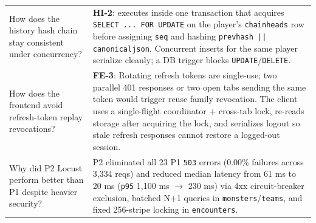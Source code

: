 \documentclass[10.5pt,a4paper]{article}
\DeclareRobustCommand{\code}[1]{\begingroup\def\_{\textunderscore\allowbreak}\texttt{#1}\endgroup}
\begin{document}
\begin{table}[H]
\begin{tabularx}{\linewidth}{@{}L{4.2cm}Y@{}}
\addlinespace
How does the history hash chain stay consistent under concurrency? &
\textbf{HI-2}:  executes inside one transaction that acquires \code{SELECT ... FOR UPDATE} on the player's \code{chain\_heads} row before assigning \code{seq} and hashing \code{prev\_hash || canonical\_json}. Concurrent inserts for the same player serialize cleanly; a DB trigger blocks \code{UPDATE}/\code{DELETE}. \\
\addlinespace
How does the frontend avoid refresh-token replay revocations? &
\textbf{FE-3}: Rotating refresh tokens are single-use; two parallel 401 responses or two open tabs sending the same token would trigger reuse family revocation. The client uses a single-flight coordinator + cross-tab lock, re-reads storage after acquiring the lock, and serializes logout so stale refresh responses cannot restore a logged-out session. \\
\addlinespace
Why did P2 Locust perform better than P1 despite heavier security? &
P2 eliminated all 23 P1 \code{503} errors (0.00\% failures across 3,334 reqs) and reduced median latency from 61 ms to 20 ms (\code{p95} 1,100 ms $\to$ 230 ms) via 4xx circuit-breaker exclusion, batched N+1 queries in \code{monsters}/\code{teams}, and fixed 256-stripe locking in \code{encounters}. \\
\bottomrule
\end{tabularx}
\end{table}
\end{document}
